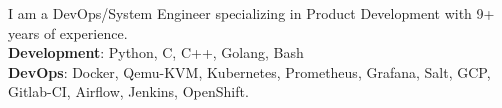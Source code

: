
\begin{cvparagraph}
    I am a DevOps/System Engineer specializing in Product Development with 9+ years of experience.\\
\textbf{Development}:  Python, C, C++, Golang, Bash\\
\textbf{DevOps}:  Docker, Qemu-KVM, Kubernetes, Prometheus, Grafana, Salt, GCP, Gitlab-CI, Airflow, Jenkins, OpenShift.\\
\end{cvparagraph}



